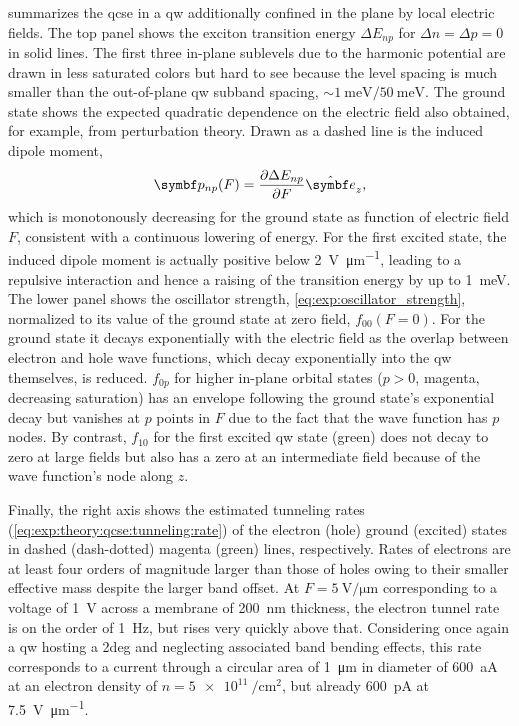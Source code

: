  summarizes the \gls{qcse} in a \gls{qw} additionally confined in the plane by local electric fields.
The top panel shows the exciton transition energy $\Delta E_{np}$ for $\Delta n = \Delta p = 0$ in solid lines.
The first three in-plane sublevels due to the harmonic potential are drawn in less saturated colors but hard to see because the level spacing is much smaller than the out-of-plane \gls{qw} subband spacing, $\sim\qty{1}{\milli\electronvolt}/\qty{50}{\milli\electronvolt}$.
The ground state shows the expected quadratic dependence on the electric field also obtained, for example, from perturbation theory.
Drawn as a dashed line is the induced dipole moment,
\begin{equation}
    \bvec{p}_{np}(F) = \pdv{\Delta E_{np}}{F}\ubvec{z},
\end{equation}
which is monotonously decreasing for the ground state as function of electric field $F$, consistent with a continuous lowering of energy.
For the first excited state, the induced dipole moment is actually positive below \qty{2}{\volt\per\micro\meter}, leading to a repulsive interaction and hence a raising of the transition energy by up to \qty{1}{\milli\electronvolt}.
The lower panel shows the oscillator strength, \cref{eq:exp:oscillator_strength}, normalized to its value of the ground state at zero field, $f_{00}(F=0)$.
For the ground state it decays exponentially with the electric field as the overlap between electron and hole wave functions, which decay exponentially into the \gls{qw} themselves, is reduced.
$f_{0p}$ for higher in-plane orbital states ($p > 0$, magenta, decreasing saturation) has an envelope following the ground state's exponential decay but vanishes at $p$ points in $F$ due to the fact that the wave function has $p$ nodes.
By contrast, $f_{10}$ for the first excited \gls{qw} state (green) does not decay to zero at large fields but also has a zero at an intermediate field because of the wave function's node along $z$.

Finally, the right axis shows the estimated tunneling rates (\cref{eq:exp:theory:qcse:tunneling:rate}) of the electron (hole) ground (excited) states in dashed (dash-dotted) magenta (green) lines, respectively.
Rates of electrons are at least four orders of magnitude larger than those of holes owing to their smaller effective mass despite the larger band offset.
At $F=\qty{5}{\volt\per\micro\meter}$ corresponding to a voltage of \qty{1}{\volt} across a membrane of \qty{200}{\nano\meter} thickness, the electron tunnel rate is on the order of \qty{1}{\hertz}, but rises very quickly above that.
Considering once again a \gls{qw} hosting a \gls{2deg} and neglecting associated band bending effects, this rate corresponds to a current through a circular area of \qty{1}{\micro\meter} in diameter of \qty{600}{\atto\ampere} at an electron density of $n = \qty{5e11}{\per\centi\meter\squared}$, but already \qty{600}{\pico\ampere} at \qty{7.5}{\volt\per\micro\meter}.

